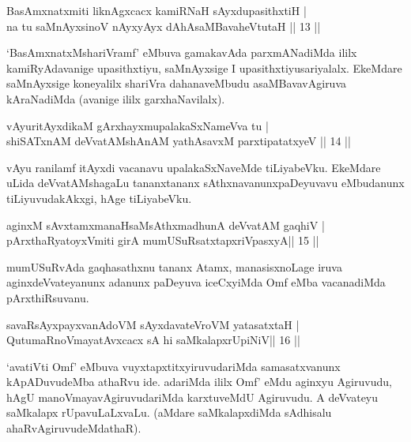 \begin{shl}
BasAmxnatxmiti liknAgxcacx kamiRNaH sAyxdupasithxtiH  | \\
na tu saMnAyxsinoV nAyxyAyx dAhAsaMBavaheVtutaH \hfill||  13 || 
\end{shl}

\begin{artha} 
`BasAmxnatxMshariVramf' eMbuva gamakavAda parxmANadiMda ililx\break 
kamiRyAdavanige upasithxtiyu, saMnAyxsige I upasithxtiyu\break sariyalalx. 
EkeMdare saMnAyxsige koneyalilx shariVra dahanaveMbudu 
asaMBavavAgiruva kAraNadiMda (avanige ililx garxhaNavilalx).
\end{artha}

\begin{shl}
vAyuritAyxdikaM gArxhayxmupalakaSxNameVva tu  | \\
shiSATxnAM deVvatAMshAnAM yathAsavxM parxtipatatxyeV \hfill||  14 || 
\end{shl}

\begin{artha} 
vAyu ranilamf itAyxdi vacanavu upalakaSxNaveMde tiLiyabeVku. EkeMdare 
uLida deVvatAMshagaLu tananxtananx sAthxnavanunx\break paDeyuvavu eMbudanunx 
tiLiyuvudakAkxgi, hAge tiLiyabeVku.
\end{artha}


\begin{shl}
aginxM sAvxtamxmanaHsaMsAthxmadhunA deVvatAM gaqhiV | \\
pArxthaRyatoyxVmiti girA mumUSuRsatxtapxriVpasxyA\hfill ||  15 || 
\end{shl}

\begin{artha} 
mumUSuRvAda gaqhasathxnu tananx Atamx, manasisxnoLage iruva 
aginxdeVvateyanunx adanunx paDeyuva iceCxyiMda Omf eMba vacanadiMda 
pArxthiRsuvanu.
\end{artha}


\begin{shl}
savaRsAyxpayxvanAdoVM sAyxdavateVroVM yatasatxtaH | \\
QutumaRnoVmayatAvxcacx sA hi saMkalapxrUpiNiV\hfill ||  16 || 
\end{shl}

\begin{artha} 
`avatiVti Omf' eMbuva vuyxtapxtitxyiruvudariMda samasatxvanunx 
kApADuvudeMba athaRvu ide. adariMda ililx Omf' eMdu aginxyu Agiruvudu, 
hAgU manoVmayavAgiruvudariMda karxtuveMdU Agiruvudu. A deVvateyu 
saMkalapx rUpavuLaLxvaLu. (aMdare saMkalapxdiMda sAdhisalu 
ahaRvAgiruvudeMdathaR).
\end{artha}

